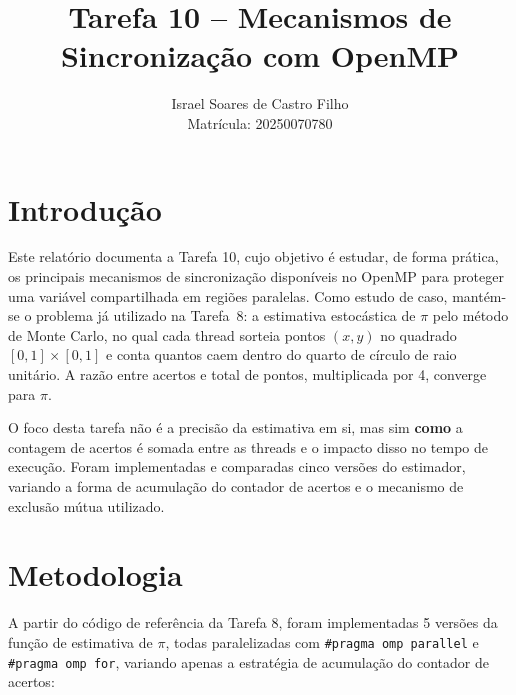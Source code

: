 \documentclass[a4paper,12pt]{article}
\title{Tarefa 10 -- Mecanismos de Sincronização com OpenMP}
\author{Israel Soares de Castro Filho \\ Matrícula: 20250070780}
\date{}
\begin{document}
\maketitle

\section{Introdução}

Este relatório documenta a Tarefa 10, cujo objetivo é estudar, de forma
prática, os principais mecanismos de sincronização disponíveis no
OpenMP para proteger uma variável compartilhada em regiões paralelas.
Como estudo de caso, mantém-se o problema já utilizado na Tarefa~8:
a estimativa estocástica de $\pi$ pelo método de Monte Carlo, no qual
cada thread sorteia pontos $(x,y)$ no quadrado $[0,1]\times[0,1]$ e
conta quantos caem dentro do quarto de círculo de raio unitário. A
razão entre acertos e total de pontos, multiplicada por 4, converge
para $\pi$.

O foco desta tarefa não é a precisão da estimativa em si, mas sim
\textbf{como} a contagem de acertos é somada entre as threads e o
impacto disso no tempo de execução. Foram implementadas e comparadas
cinco versões do estimador, variando a forma de acumulação do
contador de acertos e o mecanismo de exclusão mútua utilizado.

\section{Metodologia}

A partir do código de referência da Tarefa 8, foram implementadas
5 versões da função de estimativa de $\pi$, todas paralelizadas com
\texttt{\#pragma omp parallel} e \texttt{\#pragma omp for}, variando
apenas a estratégia de acumulação do contador de acertos:
\end{document}

